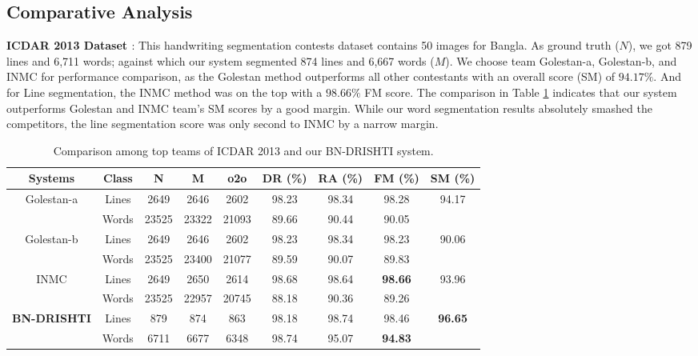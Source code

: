 \documentclass[runningheads]{llncs}
\begin{document}
\vspace{-2mm}
\subsection{Comparative Analysis}

\textbf{ICDAR 2013 Dataset \cite{stamatopoulos2013icdar}}: This handwriting segmentation contests dataset contains 50 images for Bangla. As ground truth ($N$), we got 879 lines and 6,711 words; against which our system segmented 874 lines and 6,667 words ($M$). We choose team Golestan-a, Golestan-b, and INMC for performance comparison, as the Golestan method outperforms all other contestants with an overall score (SM) of $94.17\%$. And for Line segmentation, the INMC method was on the top with a $98.66\%$ FM score. The comparison in Table \ref{drishti-tab8} indicates that our system outperforms Golestan and INMC team's SM scores by a good margin. While our word segmentation results absolutely smashed the competitors, the line segmentation score was only second to INMC by a narrow margin.

\begin{table}[h]
\vspace{-4mm}
\centering
\caption{Comparison among top teams of ICDAR 2013 and our BN-DRISHTI system.}\label{drishti-tab8}
\vspace{-1mm}
\begin{tabular}{|c|c|c|c|c|c|c|c|c|}
\hline
\textbf{Systems} & \textbf{Class} & \textbf{N} & \textbf{M} & \textbf{o2o} & \textbf{DR (\%)} & \textbf{RA (\%)} & \textbf{FM (\%)} & \textbf{SM (\%)} \\ \hline
\multirow{2}{*}{Golestan-a} & Lines & 2649 & 2646 & 2602 & 98.23 & 98.34 & 98.28 & \multirow{2}{*}{94.17} \\ \cline{2-8}
 & Words & 23525 & 23322 & 21093 & 89.66 & 90.44 & 90.05 &  \\ \hline
\multirow{2}{*}{Golestan-b} & Lines & 2649 & 2646 & 2602 & 98.23 & 98.34 & 98.23 & \multirow{2}{*}{90.06} \\ \cline{2-8}
 & Words & 23525 & 23400 & 21077 & 89.59 & 90.07 & 89.83 &  \\ \hline
\multirow{2}{*}{INMC} & Lines & 2649 & 2650 & 2614 & 98.68 & 98.64 & \textbf{98.66} & \multirow{2}{*}{93.96} \\ \cline{2-8}
 & Words & 23525 & 22957 & 20745 & 88.18 & 90.36 & 89.26 &  \\ \hline
\multirow{2}{*}{\textbf{BN-DRISHTI}} & Lines & 879 & 874 & 863 & 98.18 & 98.74 & 98.46 & \multirow{2}{*}{\textbf{96.65}} \\ \cline{2-8}
 & Words & 6711 & 6677 & 6348 & 98.74 & 95.07 & \textbf{94.83} &  \\ \hline
\end{tabular}
\vspace{-4mm}
\end{table}
\end{document}
